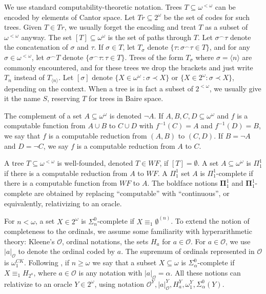 \documentclass[12pt]{amsart}
\newcommand{\kO}{\mathcal{O}}
\newcommand{\august}[1]{#1}%
\begin{document}
We use standard computability-theoretic notation.  
Trees $T \subseteq \omega^{<\omega}$ can be encoded by elements of Cantor 
space.  Let $Tr \subseteq 2^\omega$ be the set of codes for such trees. 
Given $T \in Tr$, we usually forget the encoding and treat $T$ as 
a subset of $\omega^{<\omega}$ anyway.  
The set $[T]\subseteq \omega^\omega$ is 
the set of paths through $T$.  Let $\sigma^\smallfrown\tau$ denote the 
concatenation of $\sigma$ and $\tau$.
 If $\sigma \in T$, let $T_\sigma$ denote 
$\{\tau : \sigma^\smallfrown\tau \in T\}$, 
 and for any $\sigma \in \omega^{<\omega}$, let $\sigma^\smallfrown T$ denote 
$\{\sigma^\smallfrown \tau : \tau \in T\}$.
\august{Trees of the form $T_\sigma$ where $\sigma = \langle n \rangle$
 are commonly encountered, and for these trees we drop the brackets 
and just write $T_n$ instead of $T_{\langle n \rangle}$.}
Let $[\sigma]$ denote $\{X \in \omega^\omega\ : \sigma \prec X\}$ or 
$\{X \in 2^\omega : \sigma \prec X\}$, depending on the context. 
When a tree is in fact a subset of $2^{<\omega}$, we usually give it 
the name $S$, reserving $T$ for trees in Baire space.  

The complement of a set $A \subseteq \omega^\omega$ is denoted $\neg A$. 
If $A,B,C,D\subseteq \omega^\omega$ and $f$ is a computable function 
from $A \cup B$ to $C\cup D$ with $f^{-1}(C) = A$ and $f^{-1}(D) = B$, 
we say that $f$ is a computable reduction from $(A,B)$ to $(C,D)$.
If $B = \neg A$ and $D = \neg C$, we say $f$ is a computable reduction 
from $A$ to $C$.
 
A tree 
$T \subseteq \omega^{<\omega}$ is well-founded, denoted $T \in WF$, 
if $[T] = \emptyset$.  A set $A \subseteq \omega^\omega$ is $\Pi^1_1$ 
if there is a computable reduction from $A$ to $WF$. 
A $\Pi^1_1$ set $A$ is $\Pi^1_1$-complete 
if there is a computable function from $WF$ to $A$.
The boldface notions $\mathbf \Pi^1_1$ and $\mathbf \Pi^1_1$-complete 
are obtained by replacing ``computable'' with ``continuous'', 
or equivalently, relativizing to an oracle.

For $n<\omega$, a set $X \in 2^\omega$ 
is $\Sigma^0_n$-complete if $X \equiv_1 \emptyset^{(n)}$.  To extend 
the notion of completeness to the ordinals,
we assume some familiarity with hyperarithmetic theory: Kleene's $\kO$,
ordinal notations, the sets $H_a$ for $a \in \kO$.  For $a \in \kO$, 
we use $|a|_\kO$ to denote the ordinal coded by $a$.  The supremum of 
ordinals represented in $\kO$ is $\omega_1^{CK}$.
Following \cite{ak}, if $n\geq \omega$
we say that a subset $X \subseteq \omega$ is 
$\Sigma^0_\alpha$-complete if
$X \equiv_1 H_{2^a}$, where $a \in \kO$ is any notation with 
$|a|_\kO = \alpha$. All these notions can relativize to an oracle 
$Y \in 2^\omega$, using notation $\kO^Y, |a|_\kO^Y, H_a^Y, \omega_1^Y, 
\Sigma^0_{\alpha}(Y)$. 
\end{document}
